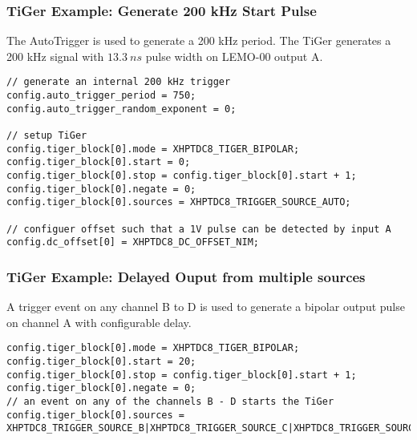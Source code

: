 \subsubsection{TiGer Example: Generate 200 kHz Start Pulse}
The AutoTrigger is used to generate a 200 kHz period. 
The TiGer generates a 200 kHz signal with $13.3 ~ns$ pulse width on LEMO-00 output A.
\begin{lstlisting}[frame=tlrb]
// generate an internal 200 kHz trigger
config.auto_trigger_period = 750;
config.auto_trigger_random_exponent = 0;

// setup TiGer 
config.tiger_block[0].mode = XHPTDC8_TIGER_BIPOLAR;
config.tiger_block[0].start = 0;
config.tiger_block[0].stop = config.tiger_block[0].start + 1;
config.tiger_block[0].negate = 0;
config.tiger_block[0].sources = XHPTDC8_TRIGGER_SOURCE_AUTO;

// configuer offset such that a 1V pulse can be detected by input A 
config.dc_offset[0] = XHPTDC8_DC_OFFSET_NIM; 
\end{lstlisting}

\subsubsection{TiGer Example: Delayed Ouput from multiple sources}
A trigger event on any channel B to D is used to generate a bipolar output pulse on channel A with configurable delay. 
\begin{lstlisting}[frame=tlrb]
config.tiger_block[0].mode = XHPTDC8_TIGER_BIPOLAR;
config.tiger_block[0].start = 20;
config.tiger_block[0].stop = config.tiger_block[0].start + 1;
config.tiger_block[0].negate = 0;
// an event on any of the channels B - D starts the TiGer 
config.tiger_block[0].sources = XHPTDC8_TRIGGER_SOURCE_B|XHPTDC8_TRIGGER_SOURCE_C|XHPTDC8_TRIGGER_SOURCE_D;
\end{lstlisting}
